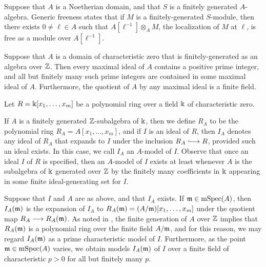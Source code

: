 \documentclass[11pt]{amsart}
\newcommand{\hooklongrightarrow}{\lhook\joinrel\longrightarrow}
\newcommand{\mspec}{\operatorname{mSpec}}
\begin{document}
\begin{remark} \label{generic-freeness} Suppose that $A$ is a Noetherian domain,  and that $S$ is a finitely generated $A$-algebra.  Generic freeness states that if $M$ is a finitely-generated $S$-module, then there exists  $0 \neq \ell \in A$ such that $A[\ell^{-1}] \otimes_A M$, the localization of $M$ at $\ell$, is free as a module over $A[\ell^{-1}]$.
\end{remark}

\begin{remark} 
\label{maximal ideals: R}
Suppose that $A$ is a domain of characteristic zero that is finitely-generated as an algebra over $\mathbb{Z}$.  Then every maximal ideal of $A$ contains a positive prime integer, and all but finitely many such prime integers are contained in some maximal ideal of $A$.  Furthermore, the quotient of $A$ by any maximal ideal is a finite field. 
\end{remark}

\begin{remark}
\label{reduction: R}
Let $R = \Bbbk[x_1, \ldots, x_m]$ be a polynomial ring over a field $\Bbbk$ of characteristic zero. 

If $A$ is a finitely generated $\mathbb{Z}$-subalgebra of $\Bbbk$, then we define $R_A$ to be the polynomial ring $R_A=A[x_1, \ldots, x_m]$, and if $I$ is an ideal of $R$, then $I_A$ denotes any ideal of $R_A$ that expands to $I$ under the inclusion $R_A \hooklongrightarrow R$, provided such an ideal exists.  In this case, we call $I_A$ an $A$-model of $I$. Observe that once an ideal $I$ of $R$ is specified, then an $A$-model of $I$ exists at least whenever $A$ is the subalgebra of $\Bbbk$ generated over $\mathbb{Z}$ by the finitely many coefficients in $\Bbbk$ appearing in some finite ideal-generating set for $I$.

Suppose that $I$ and $A$ are as above, and that $I_A$ exists.  If $\maxi \in \mspec(A)$, then $I_A(\mathfrak{m})$ is the expansion of $I_A$ to $R_{A}(\mathfrak{m})= (A/\mathfrak{m})[x_1, \ldots, x_m]$ under the quotient map $R_A \longrightarrow R_A(\mathfrak{m})$.  As noted in , the finite generation of $A$ over $\mathbb{Z}$ implies that $R_A(\mathfrak{m})$ is a polynomial ring over the finite field $A/\mathfrak{m}$, and for this reason, we may regard $I_A(\mathfrak{m})$ as a prime characteristic model of $I$.   Furthermore, as the point $\maxi \in \mspec(A)$ varies, we obtain models $I_A(\mathfrak{m})$ of $I$ over a finite field of characteristic $p>0$ for all but finitely many $p$.

\end{remark}
\end{document}

